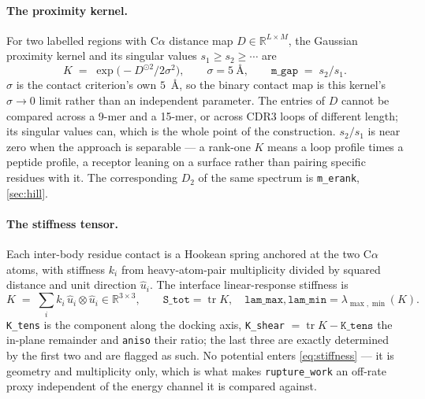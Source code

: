 \documentclass[11pt,a4paper]{article}
\newcommand{\dsc}[1]{\texttt{#1}}
\begin{document}
\paragraph{The proximity kernel.} For two labelled regions with C$\alpha$ distance map
$D \in \mathbb{R}^{L \times M}$, the Gaussian proximity kernel and its singular values
$s_1 \ge s_2 \ge \cdots$ are
%
\begin{equation}
K \;=\; \exp\!\big( -D^{\odot 2} / 2\sigma^2 \big), \qquad \sigma = 5\ \text{\AA},
\qquad
\dsc{m\_gap} \;=\; s_2/s_1 .
\label{eq:kernel}
\end{equation}
%
$\sigma$ is the contact criterion's own $5$~\AA, so the binary contact map is this kernel's
$\sigma \to 0$ limit rather than an independent parameter. The entries of $D$ cannot be compared
across a 9-mer and a 15-mer, or across CDR3 loops of different length; its singular values can,
which is the whole point of the construction. $s_2/s_1$ is near zero when the approach is separable
--- a rank-one $K$ means a loop profile times a peptide profile, a receptor leaning on a surface
rather than pairing specific residues with it. The corresponding $D_2$ of the same spectrum is
\dsc{m\_erank}, \cref{sec:hill}.

\paragraph{The stiffness tensor.} Each inter-body residue contact is a Hookean spring anchored at
the two C$\alpha$ atoms, with stiffness $k_i$ from heavy-atom-pair multiplicity divided by squared
distance and unit direction $\hat u_i$. The interface linear-response stiffness is
%
\begin{equation}
K \;=\; \sum_i k_i \, \hat u_i \otimes \hat u_i \in \mathbb{R}^{3\times 3},
\qquad
\dsc{S\_tot} = \operatorname{tr} K, \quad
\dsc{lam\_max}, \dsc{lam\_min} = \lambda_{\max,\min}(K).
\label{eq:stiffness}
\end{equation}
%
\dsc{K\_tens} is the component along the docking axis, \dsc{K\_shear} $= \operatorname{tr} K -
\dsc{K\_tens}$ the in-plane remainder and \dsc{aniso} their ratio; the last three are exactly
determined by the first two and are flagged as such. No potential enters \cref{eq:stiffness} --- it
is geometry and multiplicity only, which is what makes \dsc{rupture\_work} an off-rate proxy
independent of the energy channel it is compared against.

\end{document}
